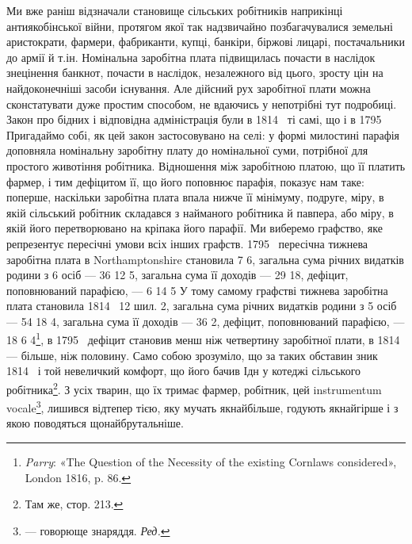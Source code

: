 
Ми вже раніш відзначали становище сільських робітників
наприкінці антиякобінської війни, протягом якої так надзвичайно
позбагачувалися земельні аристократи, фармери, фабриканти,
купці, банкіри, біржові лицарі, постачальники до армії
й т.ін. Номінальна заробітна плата підвищилась почасти в наслідок
знецінення банкнот, почасти в наслідок, незалежного від
цього, зросту цін на найдоконечніші засоби існування. Але дійсний
рух заробітної плати можна сконстатувати дуже простим
способом, не вдаючись у непотрібні тут подробиці. Закон про
бідних і відповідна адміністрація були в 1814~ ті самі, що і в
1795~ Пригадаймо собі, як цей закон застосовувано на селі:
у формі милостині парафія доповняла номінальну заробітну
плату до номінальної суми, потрібної для простого животіння
робітника. Відношення між заробітною платою, що її платить
фармер, і тим дефіцитом її, що його поповнює парафія, показує
нам таке: поперше, наскільки заробітна плата впала нижче її
мінімуму, подруге, міру, в якій сільський робітник складався
з найманого робітника й павпера, або міру, в якій його перетворювано
на кріпака його парафії. Ми виберемо графство, яке
репрезентує пересічні умови всіх інших графств. 1795~ пересічна
тижнева заробітна плата в Northamptonshire становила
7 6, загальна сума річних видатків родини з
6 осіб — 36 12 5, загальна сума
її доходів — 29 18, дефіцит, поповнюваний
парафією, — 6 14 5
У тому самому графстві тижнева заробітна плата становила 1814~
12 шил. 2, загальна сума річних видатків родини з 5 осіб —
54 18 4, загальна сума її доходів
— 36 2, дефіцит, поповнюваний
парафією, — 18 6 4\footnote{
\emph{Parry}: «The Question of the Necessity of the existing Cornlaws
considered», London 1816, p. 86.
}, в 1795~
дефіцит становив менш ніж четвертину заробітної плати, в
1814~ — більше, ніж половину. Само собою зрозуміло, що за
таких обставин зник 1814~ і той невеличкий комфорт, що його
бачив Ідн у котеджі сільського робітника\footnote{
Там же, стор. 213.
}. З усіх тварин,
що їх тримає фармер, робітник, цей instrumentum vocale\footnote*{
— говорюще знаряддя. \emph{Ред.}
}, лишився
відтепер тією, яку мучать якнайбільше, годують якнайгірше і
з  якою поводяться щонайбрутальніше.

